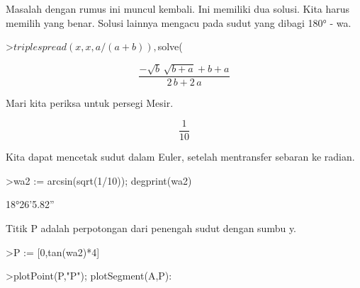 \documentclass[12pt,arial,letterpaper]{book}
\begin{document}
\begin{eulercomment}
\begin{eulercomment}
\begin{eulercomment}
\begin{eulercomment}
\begin{eulercomment}
\begin{eulercomment}
\begin{eulercomment}
\begin{eulercomment}
\begin{eulercomment}
\begin{eulercomment}
\begin{eulercomment}
\begin{eulercomment}
\begin{eulercomment}
\begin{eulercomment}
\begin{eulercomment}
\begin{eulercomment}
\begin{eulercomment}
\begin{eulercomment}
\begin{eulercomment}
\begin{eulercomment}
\begin{eulercomment}
\begin{eulercomment}
\begin{eulercomment}
\begin{eulercomment}
\begin{eulercomment}
\begin{eulercomment}
\begin{eulercomment}
\begin{eulercomment}
\begin{eulercomment}
Masalah dengan rumus ini muncul kembali. Ini memiliki dua solusi. Kita
harus memilih yang benar. Solusi lainnya mengacu pada sudut yang
dibagi 180° - wa.
\end{eulercomment}
\begin{eulerprompt}
>$triplespread(x,x,a/(a+b)), $solve(%
\end{eulerprompt}
\begin{eulerformula}
\[
\frac{-\sqrt{b}\,\sqrt{b+a}+b+a}{2\,b+2\,a}
\]
\end{eulerformula}
\begin{eulercomment}
Mari kita periksa untuk persegi Mesir.
\end{eulercomment}
\begin{eulerformula}
\[
\frac{1}{10}
\]
\end{eulerformula}
\begin{eulercomment}
Kita dapat mencetak sudut dalam Euler, setelah mentransfer sebaran ke
radian.
\end{eulercomment}
\begin{eulerprompt}
>wa2 := arcsin(sqrt(1/10)); degprint(wa2)
\end{eulerprompt}
\begin{euleroutput}
  18°26'5.82''
\end{euleroutput}
\begin{eulercomment}
Titik P adalah perpotongan dari penengah sudut dengan sumbu y.
\end{eulercomment}
\begin{eulerprompt}
>P := [0,tan(wa2)*4]
\end{eulerprompt}
\begin{euleroutput}
  [0,  1.33333]
\end{euleroutput}
\begin{eulerprompt}
>plotPoint(P,"P"); plotSegment(A,P):

\end{eulerprompt}
\end{eulercomment}
\end{eulercomment}
\end{eulercomment}
\end{eulercomment}
\end{eulercomment}
\end{eulercomment}
\end{eulercomment}
\end{eulercomment}
\end{eulercomment}
\end{eulercomment}
\end{eulercomment}
\end{eulercomment}
\end{eulercomment}
\end{eulercomment}
\end{eulercomment}
\end{eulercomment}
\end{eulercomment}
\end{eulercomment}
\end{eulercomment}
\end{eulercomment}
\end{eulercomment}
\end{eulercomment}
\end{eulercomment}
\end{eulercomment}
\end{eulercomment}
\end{eulercomment}
\end{eulercomment}
\end{eulercomment}
\end{document}
